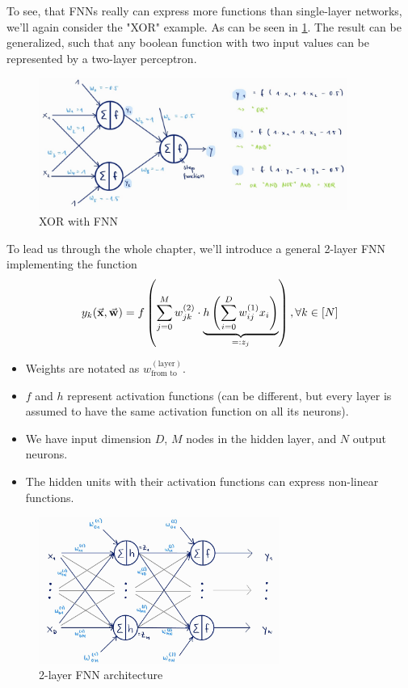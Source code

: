 To see, that FNNs really can express more functions than single-layer networks, we'll again consider the "XOR" example. As can be seen in \ref{fig:6_fnn_xor}. The result can be generalized, such that any boolean function with two input values can be represented by a two-layer perceptron.

\begin{figure}[H]
  \centering
  \includegraphics[width=0.9\textwidth]{assets/nn/fnn__xor.png}
  \caption{XOR with FNN}
  \label{fig:6_fnn_xor}
\end{figure}

To lead us through the whole chapter, we'll introduce a general 2-layer FNN implementing the function
\begin{align*}
  y_k(\vec{\mathbf{x}}, \vec{\mathbf{w}}) = f\left(\sum_{j=0}^M w_{jk}^{(2)}\cdot \underbrace{h\left(\sum_{i=0}^D w_{ij}^{(1)}x_i\right)}_{=:z_j}\right), \forall k\in[N]
\end{align*}
\begin{itemize}
  \item Weights are notated as $w_{\text{from to}}^{(\text{layer})}$.
  \item $f$ and $h$ represent activation functions (can be different, but every layer is assumed to have the same activation function on all its neurons).
  \item We have input dimension $D$, $M$ nodes in the hidden layer, and $N$ output neurons.
  \item The hidden units with their activation functions can express non-linear functions.
\end{itemize}

\begin{figure}[H]
  \centering
  \includegraphics[width=0.7\textwidth]{assets/nn/fnn__architecture.png}
  \caption{2-layer FNN architecture}
  \label{fig:6_fnn_arch}
\end{figure}
